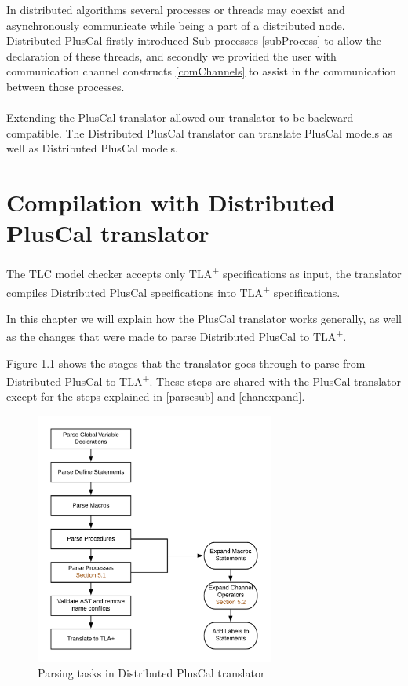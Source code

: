 \documentclass{thesul}
\newcommand{\tlaplus}{TLA\textsuperscript{+}\xspace}
\begin{document}
In distributed algorithms several processes or threads may coexist and asynchronously communicate while being a part of a distributed node. Distributed PlusCal firstly introduced Sub-processes \ref{subProcess} to allow the declaration of these threads, and secondly we provided the user with communication channel constructs \ref{comChannels} to assist in the communication between those processes.
\\\\
Extending the PlusCal translator allowed our translator to be backward compatible. The Distributed PlusCal translator can translate PlusCal models as well as Distributed PlusCal models.

\chapter{Compilation with Distributed PlusCal translator}

The TLC model checker accepts only \tlaplus specifications as input, the translator compiles Distributed PlusCal specifications into \tlaplus specifications.

In this chapter we will explain how the PlusCal translator works generally, as well as the changes that were made to parse Distributed PlusCal to \tlaplus.

Figure \ref{translator} shows the stages that the translator goes through to parse from Distributed PlusCal to \tlaplus. These steps are shared with the PlusCal translator except for the steps explained in \ref{parsesub} and \ref{chanexpand}.

\begin{figure}[!h]
\label{translator}
\centering
\includegraphics[width=0.7\textwidth]{chart}
\caption{Parsing tasks in Distributed PlusCal translator}
\end{figure}
\end{document}
